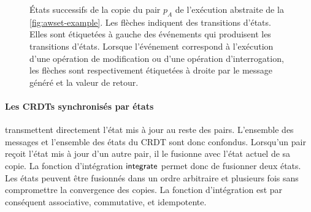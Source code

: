 \begin{figure}[bth]
\centering
{}
\caption{États successifs de la copie du pair $p_A$ de l'exécution abstraite de la \autoref{fig:awset-example}.
Les flèches indiquent des transitions d'états.
Elles sont étiquetées à gauche des événements qui produisent les transitions d'états.
Lorsque l'événement correspond à l'exécution d'une opération de modification ou d'une opération d'interrogation, les flèches sont respectivement étiquetées à droite par le message généré et la valeur de retour.}\label{fig:op-awset-state-trans}
\end{figure}


\paragraph{Les \acp{CRDT} synchronisés par états} transmettent directement l'état mis à jour au reste des pairs.
L'ensemble des messages et l'ensemble des états du \ac{CRDT} sont donc confondus.
Lorsqu'un pair reçoit l'état mis à jour d'un autre pair, il le fusionne avec l'état actuel de sa copie.
La fonction d'intégration $\operatorname{\mathsf{integrate}}$ permet donc de fusionner deux états.
Les états peuvent être fusionnés dans un ordre arbitraire et plusieurs fois sans compromettre la convergence des copies.
La fonction d'intégration est par conséquent associative, commutative, et idempotente.


